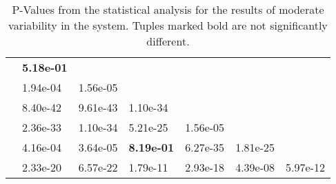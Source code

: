 \documentclass[envcountsame]{llncs}
\begin{document}
\begin{table}
\begin{center}
\begin{tabular}{lP{1.75cm}P{1.75cm}P{1.75cm}P{1.75cm}P{1.75cm}P{1.75cm}}
      \midrule
          & \textbf{5.18e-01} &           &                   &           &           &             \\
          & 1.94e-04          & 1.56e-05  &                   &           &           &             \\
      \BILOne{}    & 8.40e-42          & 9.61e-43  & 1.10e-34          &           &           &             \\
      \BILTwo{}    & 2.36e-33          & 1.10e-34  & 5.21e-25          & 1.56e-05  &           &             \\
      \BILThree{}  & 4.16e-04          & 3.64e-05  & \textbf{8.19e-01} & 6.27e-35  & 1.81e-25  &             \\
      \BILFour{}   & 2.33e-20          & 6.57e-22  & 1.79e-11          & 2.93e-18  & 4.39e-08  & 5.97e-12    \\
      \bottomrule
    \end{tabular}
  \end{center}
  \caption{\label{tbl:stats-unif}P-Values from the statistical analysis for the results of
    moderate variability in the system. Tuples marked bold are not significantly different.}
\end{table}
\end{document}
